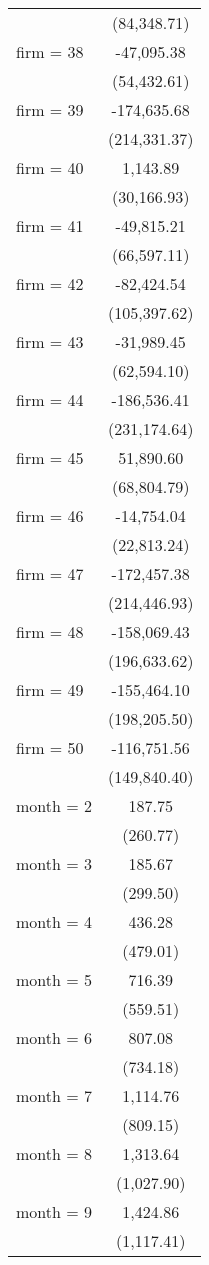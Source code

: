 \begin{tabular}{lc}
 & (84,348.71) \\
firm = 38 & -47,095.38 \\
 & (54,432.61) \\
firm = 39 & -174,635.68 \\
 & (214,331.37) \\
firm = 40 & 1,143.89 \\
 & (30,166.93) \\
firm = 41 & -49,815.21 \\
 & (66,597.11) \\
firm = 42 & -82,424.54 \\
 & (105,397.62) \\
firm = 43 & -31,989.45 \\
 & (62,594.10) \\
firm = 44 & -186,536.41 \\
 & (231,174.64) \\
firm = 45 & 51,890.60 \\
 & (68,804.79) \\
firm = 46 & -14,754.04 \\
 & (22,813.24) \\
firm = 47 & -172,457.38 \\
 & (214,446.93) \\
firm = 48 & -158,069.43 \\
 & (196,633.62) \\
firm = 49 & -155,464.10 \\
 & (198,205.50) \\
firm = 50 & -116,751.56 \\
 & (149,840.40) \\
month = 2 & 187.75 \\
 & (260.77) \\
month = 3 & 185.67 \\
 & (299.50) \\
month = 4 & 436.28 \\
 & (479.01) \\
month = 5 & 716.39 \\
 & (559.51) \\
month = 6 & 807.08 \\
 & (734.18) \\
month = 7 & 1,114.76 \\
 & (809.15) \\
month = 8 & 1,313.64 \\
 & (1,027.90) \\
month = 9 & 1,424.86 \\
 & (1,117.41) \\

\end{tabular}
